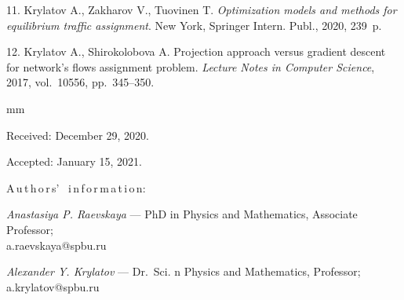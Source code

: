 {11. Krylatov A., Zakharov V., Tuovinen T.
{\it Optimization models and methods for equilibrium traffic assignment}.
New York, Springer Intern. Publ., 2020, 239~p.

12. Krylatov A., Shirokolobova A.
Projection approach versus gradient descent for network's flows assignment problem.
{\it Lecture Notes in Computer Science}, 2017, vol.~10556, pp.~345--350.


mm

%


Received:  December 29, 2020.

Accepted: January 15, 2021.


\pagebreak

A\,u\,t\,h\,o\,r\,s' \ i\,n\,f\,o\,r\,m\,a\,t\,i\,o\,n:

\vskip 2mm \textit{Anastasiya P. Raevskaya} --- PhD in Physics and
Mathematics, Associate Professor;\\ a.raevskaya@spbu.ru

\vskip 2mm \textit{Alexander Y. Krylatov} ---  Dr.~Sci. n Physics and Mathematics, Professor; a.krylatov@spbu.ru \par
%
%
}
